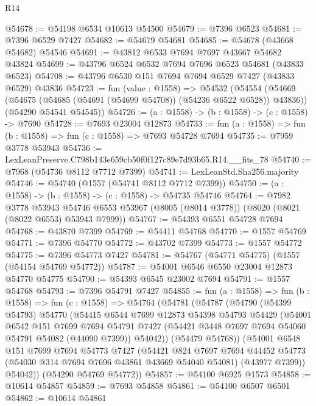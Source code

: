 \begin{lexlean}{R14}
\begin{coremodule}
@54678 := @54198 @6534 @10613 @54500
@54679 := @7396 @6523
@54681 := @7396 @6529 @7427
@54682 := @54679 @54681
@54685 := @54678 (@43668 @54682) @54546
@54691 := @43812 @6533 @7694 @7697 @43667 @54682 @43824
@54699 := @43796 @6524 @6532 @7694 @7696 @6523 @54681 (@43833 @6523)
@54708 := @43796 @6530 @151 @7694 @7694 @6529 @7427 (@43833 @6529) @43836
@54723 := fun (value : @1558) =>
  @54532
    (@54554
      (@54669 (@54675 (@54685 (@54691 (@54699 @54708)) (@54236 @6522 @6528)) @43836))
      (@54290 @54541 @54545))
@54726 := (a : @1558) -> (b : @1558) -> (c : @1558) -> @7690
@54728 := @7693 @23004 @12873
@54733 := fun (a : @1558) => fun (b : @1558) => fun (c : @1558) => @7693 @54728 @7694
@54735 := @7959 @3778 @53943
@54736 := LexLeanPreserve.C798b143e659cb50f0f127c89e7d93b65.R14.__fits_78
@54740 := @7968 (@54736 @8112 @7712 @7399)
@54741 := LexLeanStd.Sha256.majority
@54746 := @54740 (@1557 (@54741 @8112 @7712 @7399))
@54750 := (a : @1558) -> (b : @1558) -> (c : @1558) -> @54735 @54746
@54764 := @7982
    @3778
    @53943
    @54746
    @6553
    @53967
    (@8005 (@8014 @3778))
    (@8020 (@8021 (@8022 @6553) @53943 @7999))
@54767 := @54393 @6551 @54728 @7694
@54768 := @43870 @7399
@54769 := @54411 @54768
@54770 := @1557 @54769
@54771 := @7396 @54770
@54772 := @43702 @7399
@54773 := @1557 @54772
@54775 := @7396 @54773 @7427
@54781 := @54767 (@54771 @54775) (@1557 (@54154 @54769 @54772))
@54787 := @54001 @6546 @6550 @23004 @12873 @54770 @54775
@54790 := @54393 @6545 @23002 @7694
@54791 := @1557 @54768
@54793 := @7396 @54791 @7427
@54855 := fun (a : @1558) =>
  fun (b : @1558) =>
  fun (c : @1558) =>
  @54764
    (@54781
      (@54787
        (@54790
          (@54399 @54793)
          @54770
          (@54415
            @6544
            @7699
            @12873
            @54398
            @54793
            @54429
            (@54001
              @6542
              @151
              @7699
              @7694
              @54791
              @7427
              (@54421 @3448 @7697 @7694 @54060 @54791 @54082 (@44090 @7399))
              @54042))
          (@54479 @54768))
        (@54001
          @6548
          @151
          @7699
          @7694
          @54773
          @7427
          (@54421
            @824
            @7697
            @7694
            @44452
            @54773
            (@54030 @314 @7694 @7696 @43861 @43669 @54040 @54081)
            (@43977 @7399))
          @54042))
      (@54290 @54769 @54772))
@54857 := @54100 @6925 @1573
@54858 := @10614 @54857
@54859 := @7693 @54858
@54861 := @54100 @6507 @6501
@54862 := @10614 @54861

\end{coremodule}
\end{lexlean}
